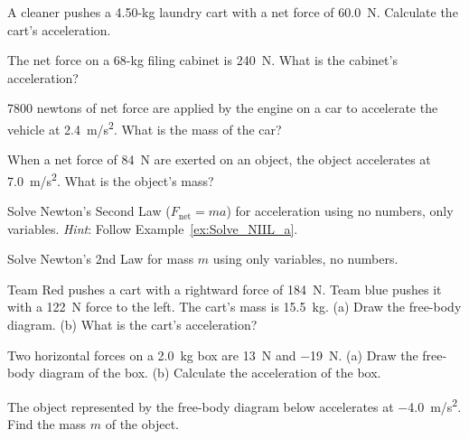\documentclass{article}
\begin{document}
\begin{exercise} \label{goj4oA}
    A cleaner pushes a 4.50-kg laundry cart with a net force of \SI{60.0}{N}. Calculate the cart's acceleration.
\end{exercise}

\begin{exercise} \label{G333de}
    The net force on a 68-kg filing cabinet is \SI{240}{N}. What is the cabinet's acceleration?
\end{exercise}

\begin{exercise} \label{8M4KDp}
    7800 newtons of net force are applied by the engine on a car to accelerate the vehicle at \SI{2.4}{m/s^2}. What is the mass of the car?
\end{exercise}

\begin{exercise} \label{EAtsO8}
    When a net force of \SI{84}{N} are exerted on an object, the object accelerates at \SI{7.0}{m/s^2}. What is the object's mass?
\end{exercise}

\begin{exercise} \label{vuAqX8}
    Solve Newton's Second Law ($F_{\text{net}} = ma$) for acceleration using no numbers, only variables. \textit{Hint}: Follow Example~\ref{ex:Solve_NIIL_a}.
\end{exercise}

\begin{exercise} \label{zVvXad}
    Solve Newton's 2nd Law for mass $m$ using only variables, no numbers.
\end{exercise}

\begin{exercise} \label{XfTcUv}
Team Red pushes a cart with a rightward force of \SI{184}{N}. Team blue pushes it with a \SI{122}{N} force to the left. The cart's mass is \SI{15.5}{kg}. (a) Draw the free-body diagram. (b) What is the cart's acceleration?
\end{exercise}

\begin{exercise} \label{uawqLb}
    Two horizontal forces on a \SI{2.0}{kg} box are \SI{13}{N} and \SI{-19}{N}. (a) Draw the free-body diagram of the box. (b) Calculate the acceleration of the box. 
\end{exercise}

\begin{exercise} \label{FWDsH3}
The object represented by the free-body diagram below accelerates at \SI{-4.0}{m/s^2}. Find the mass $m$ of the object.
\end{exercise}
\end{document}
